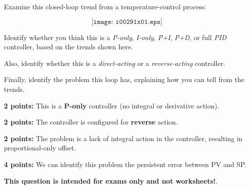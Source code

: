 

Examine this closed-loop trend from a temperature-control process:

$$\texttt{[image: i00291x01.eps]}$$

Identify whether you think this is a {\it P-only}, {\it I-only}, {\it P+I}, {\it P+D}, or full {\it PID} controller, based on the trends shown here.

\vskip 10pt

Also, identify whether this is a {\it direct-acting} or a {\it reverse-acting} controller.

\vskip 10pt

Finally, identify the problem this loop has, explaining how you can tell from the trends.

\vskip 50pt







{\bf 2 points:} This is a {\bf P-only} controller (no integral or derivative action).  

\vskip 10pt

{\bf 2 points:} The controller is configured for {\bf reverse} action.

\vskip 10pt

{\bf 2 points:} The problem is a lack of integral action in the controller, resulting in proportional-only offset.

\vskip 10pt

{\bf 4 points:} We can identify this problem the persistent error between PV and SP.







{\bf This question is intended for exams only and not worksheets!}.



